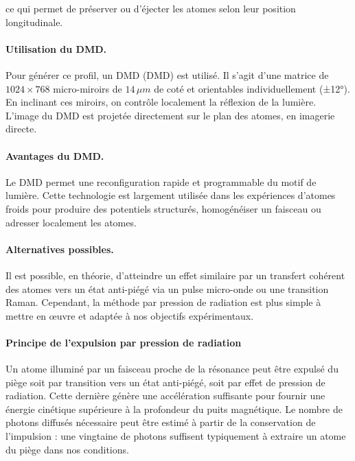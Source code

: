 ce qui permet de préserver ou d’éjecter les atomes selon leur position longitudinale.

\paragraph{Utilisation du DMD.}

Pour générer ce profil, un \gls{DMD} (\acrlong{DMD}) est utilisé. Il s’agit d’une matrice de \(1024 \times 768\) micro-miroirs de $14 \, \mu m$ de coté et  orientables individuellement (±12°). En inclinant ces miroirs, on contrôle localement la réflexion de la lumière. L’image du \gls*{DMD} est projetée directement sur le plan des atomes, en imagerie directe.

\paragraph{Avantages du DMD.}

Le  \gls{DMD} permet une reconfiguration rapide et programmable du motif de lumière. Cette technologie est largement utilisée dans les expériences d’atomes froids pour produire des potentiels structurés, homogénéiser un faisceau ou adresser localement les atomes.

\paragraph{Alternatives possibles.}

Il est possible, en théorie, d’atteindre un effet similaire par un transfert cohérent des atomes vers un état anti-piégé via un pulse micro-onde ou une transition Raman. Cependant, la méthode par pression de radiation est plus simple à mettre en œuvre et adaptée à nos objectifs expérimentaux.

\paragraph{Principe de l’expulsion par pression de radiation}

Un atome illuminé par un faisceau proche de la résonance peut être expulsé du piège soit par transition vers un état anti-piégé, soit par effet de pression de radiation. Cette dernière génère une accélération suffisante pour fournir une énergie cinétique supérieure à la profondeur du puits magnétique. Le nombre de photons diffusés nécessaire peut être estimé à partir de la conservation de l’impulsion : une vingtaine de photons suffisent typiquement à extraire un atome du piège dans nos conditions.

